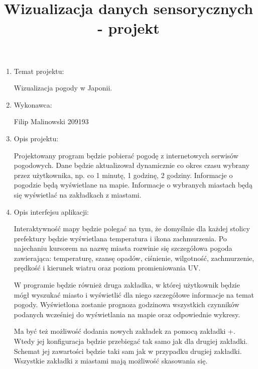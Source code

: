 \documentclass[a4paper]{article}
\title{Wizualizacja danych sensorycznych - projekt}
\date{}
\begin{document}
\maketitle

\begin{enumerate}

\item Temat projektu:

Wizualizacja pogody w Japonii.

\item Wykonawca:

Filip Malinowski 209193

\item Opis projektu:

Projektowany program będzie pobierać pogodę z internetowych serwisów pogodowych. Dane będzie aktualizował dynamicznie co okres czasu wybrany przez użytkownika, np. co 1 minutę, 1 godzinę, 2 godziny. Informacje o pogodzie będą wyświetlane na mapie. Informacje o wybranych miastach będą się wyświetlać na zakładkach z miastami.

\item Opis interfejsu aplikacji:

Interaktywność mapy będzie polegać na tym, że domyślnie dla każdej stolicy prefektury będzie wyświetlana temperatura i ikona zachmurzenia. Po najechaniu kursorem na nazwę miasta rozwinie się szczegółowa pogoda zawierająca: temperaturę, szansę opadów, ciśnienie, wilgotność, zachmurzenie, prędkość i kierunek wiatru oraz poziom promieniowania UV.

W programie będzie również druga zakładka, w której użytkownik będzie mógł wyszukać miasto i wyświetlić dla niego szczegółowe informacje na temat pogody. Wyświetlona zostanie prognoza godzinowa wszystkich czynników podanych wcześniej do wyświetlania na mapie oraz odpowiednie wykresy.

Ma być też możliwość dodania nowych zakładek za pomocą zakładki +. Wtedy jej konfiguracja będzie przebiegać tak samo jak dla drugiej zakładki. Schemat jej zawartości będzie taki sam jak w przypadku drugiej zakładki. Wszystkie zakładki z miastami mają możliwość skasowania się.


\end{enumerate}
\end{document}

